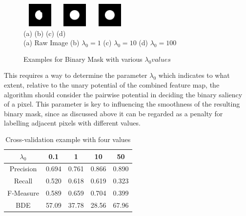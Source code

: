 \documentclass[10pt,twocolumn,letterpaper]{article}
\newcommand{\hs}{\hspace{0.58in}}
\begin{document}
\begin{figure}[t]
\begin{center}
    \includegraphics[width=0.7in,height=0.48in]{./Figures/Lambda/5_154_154732_2.jpg}
    \includegraphics[width=0.7in,height=0.48in]{./Figures/Lambda/5_154_154732_3.jpg} 
    \includegraphics[width=0.7in,height=0.48in]{./Figures/Lambda/5_154_154732_4.jpg} \\
    \footnotesize \hspace{0.1cm} (a) \hs (b) \hs  (c) \hs (d) \\
    \footnotesize  (a) Raw Image (b) $\lambda_0 = 1$  (c) $\lambda_0 = 10$ (d) $\lambda_0 =100$ \\
     \caption{Examples for Binary Mask with various $\lambda_0 values$}
\end{center}
\end{figure}


This requires a way to determine the parameter $\lambda_0$ which indicates to what extent, relative to the unary potential of the combined feature map, the algorithm should consider the pairwise potential in deciding the binary saliency of a pixel.  This parameter is key to influencing the smoothness of the resulting binary mask, since as discussed above it can be regarded as a penalty for labelling adjacent pixels with different values.

\begin{table}[h]
\begin{center}
\begin{tabular}{||c||c|c|c|c|}
    \hline
    $\lambda_0$ & 0.1 & 1   & 10 & 50 \\ \hline
    Precision   & 0.694 & 0.761 & 0.866 & 0.890 \\
    Recall      & 0.520 & 0.618 & 0.619 & 0.323 \\
    F-Measure   & 0.589 & 0.659 & 0.704 & 0.399 \\
    BDE         & 57.09 & 37.78 & 28.56 & 67.96 \\ \hline
\end{tabular}

\caption{Cross-validation example with four values}
\end{center}
\end{table}
\end{document}
